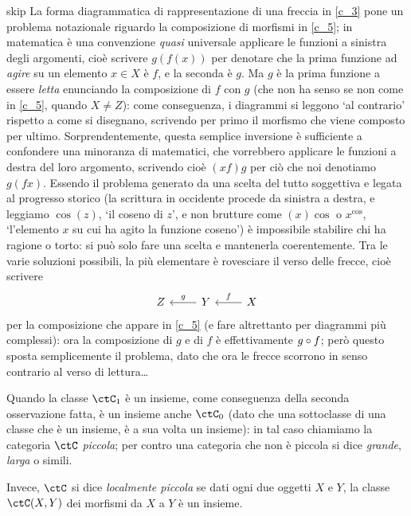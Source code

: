 \begin{hRemark}{skip}\label{sulla_compo}
	La forma diagrammatica di rappresentazione di una freccia in \ref{c_3} pone un problema notazionale riguardo la composizione di morfismi in \ref{c_5}; in matematica è una convenzione \emph{quasi} universale applicare le funzioni a sinistra degli argomenti, cioè scrivere \(g(f(x))\) per denotare che la prima funzione ad \emph{agire} su un elemento \(x\in X\) è \(f\), e la seconda è \(g\). Ma \(g\) è la prima funzione a essere \emph{letta} enunciando la composizione di \(f\) con \(g\) (che non ha senso se non come in \ref{c_5}, quando \(X\ne Z\)): come conseguenza, i diagrammi si leggono `al contrario' rispetto a come si disegnano, scrivendo per primo il morfismo che viene composto per ultimo.  Sorprendentemente, questa semplice inversione è sufficiente a confondere una minoranza di matematici, che vorrebbero applicare le funzioni a destra del loro argomento, scrivendo cioè \((xf)g\) per ciò che noi denotiamo \(g(fx)\). Essendo il problema generato da una scelta del tutto soggettiva e legata al progresso storico (la scrittura in occidente procede da sinistra a destra, e leggiamo \(\cos(z)\), `il coseno di \(z\)', e non brutture come \((x)\!\cos\) o \(x^{\cos}\), `l'elemento \(x\) su cui ha agito la funzione coseno') è impossibile stabilire chi ha ragione o torto: si può solo fare una scelta e mantenerla coerentemente. Tra le varie soluzioni possibili, la più elementare è rovesciare il verso delle frecce, cioè scrivere
	\[
		\begin{tikzcd}
			Z
			& Y \ar[l, "g"'] & X \ar[l, "f"']
		\end{tikzcd}
	\]
	per la composizione che appare in \ref{c_5} (e fare altrettanto per diagrammi più complessi): ora la composizione di \(g\) e di \(f\) è effettivamente \(g\circ f\); però questo sposta semplicemente il problema, dato che ora le frecce scorrono in senso contrario al verso di lettura\dots
\end{hRemark}
\begin{definition}\label{def_cat_piccola_locpiccola}
	Quando la classe \(\ctC_1\) è un insieme, come conseguenza della seconda osservazione fatta, è un insieme anche \(\ctC_0\) (dato che una sottoclasse di una classe che è un insieme, è a sua volta un insieme): in tal caso chiamiamo la categoria \(\ctC\) \emph{piccola}; per contro	una categoria che non è piccola si dice \emph{grande}, \emph{larga} o simili.

	Invece, \(\ctC\) si dice \emph{localmente piccola} se dati ogni due oggetti \(X\) e \(Y\), la classe \(\Hom{\ctC}(X,Y)\) dei morfismi da \(X\) a \(Y\) è un insieme.
\end{definition}
